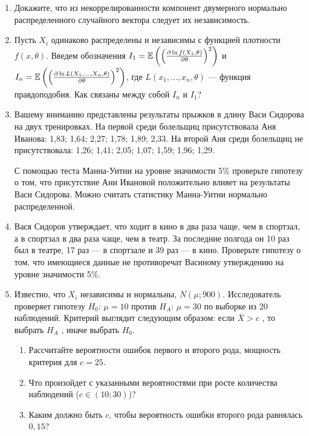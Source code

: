 \documentclass[12pt, a4paper]{article}\usepackage[]{graphicx}\usepackage[]{color}
\begin{document}
\begin{enumerate}
\item Докажите, что из некоррелированности компонент двумерного нормально распределенного случайного вектора следует их независимость.

\item Пусть $X_i$ одинаково распределены и независимы с функцией плотности $f(x,\theta)$. Введем обозначения $I_1=\mathbb{E}\left(\left(\frac{\partial \ln f(X_1,\theta)}{\partial\theta}\right)^2\right)$ и $I_n=\mathbb{E}\left(\left(\frac{\partial \ln L(X_1,\ldots,X_n,\theta)}{\partial \theta}\right)^2\right)$, где $L(x_1,\ldots, x_n,\theta)$ — функция правдоподобия. Как связаны между собой $I_n$ и $I_1$?

\item Вашему вниманию представлены результаты прыжков в длину
Васи Сидорова на двух тренировках. На первой среди болельщиц
присутствовала Аня Иванова: 1,83; 1,64; 2,27;
1,78; 1,89; 2,33. На второй Аня среди болельщиц не
присутствовала: 1,26; 1,41; 2,05; 1,07; 1,59; 1,96; 1,29.

С помощью теста Манна-Уитни на уровне значимости 5\% проверьте гипотезу о
том, что присутствие Ани Ивановой положительно влияет на
результаты Васи Сидорова. Можно считать статистику Манна-Уитни нормально распределенной.


\item Вася Сидоров утверждает, что ходит в кино в два раза чаще, чем в
спортзал, а в спортзал в два раза чаще, чем в театр. За последние
полгода он 10 раз был в театре, 17 раз — в спортзале и
39 раз — в кино. Проверьте гипотезу о том, что имеющиеся данные не противоречат Васиному утверждению на уровне значимости 5\%.


\item  Известно, что  $X_{i}$ независимы и нормальны, $N\left(\mu ;900\right)$.
Исследователь проверяет гипотезу $H_{0}$: $\mu =10$  против
$H_{A}$: $\mu =30$  по выборке из 20 наблюдений. Критерий выглядит
следующим образом: если  $\bar{X}>c$ , то выбрать  $H_{A} $ ,
иначе выбрать  $H_{0} $.
\begin{enumerate}
\item  Рассчитайте вероятности ошибок
первого и второго рода, мощность критерия для $c=25$.
\item Что произойдет с указанными вероятностями при росте количества
наблюдений ($c\in(10;30)$)?
\item Каким должно быть $c$, чтобы вероятность ошибки второго рода
равнялась $0,15$?
\end{enumerate}





\end{enumerate}
\end{document}
